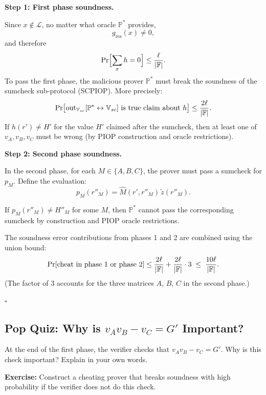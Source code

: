 \documentclass[11pt]{article}
\begin{document}
\medskip
\noindent\textbf{Step 1: First phase soundness.}

Since $x \notin \mathcal{L}$, no matter what oracle $\mathbb{P}^*$ provides,
\[
  g_{\mathrm{res}}(x) \neq 0,
\]
and therefore
\[
  \Pr\Bigl[\sum_x h = 0\Bigr] \leq \frac{\ell}{|\mathbb{F}|}.
\]
To pass the first phase, the malicious prover $\mathbb{P}^*$ must break the soundness of
the sumcheck sub-protocol (SCPIOP).  More precisely:
\[
  \Pr\bigl[\text{out}_{\mathbb{V}_{sc}}[\mathbb{P}^* \leftrightarrow \mathbb{V}_{sc}]
  \text{ is true claim about }h\bigr]
  \leq \frac{2\ell}{|\mathbb{F}|}.
\]
If $h(r') \neq H'$ for the value $H'$ claimed after the sumcheck, then at least one of
$v_A, v_B, v_C$ must be wrong (by PIOP construction and oracle restrictions).

\medskip
\noindent\textbf{Step 2: Second phase soundness.}

In the second phase, for each $M \in \{A, B, C\}$, the prover must pass a sumcheck for
$p_M$.  Define the evaluation:
\[
  p_M(r''_M) = \widehat{M}(r', r''_M)\,\tilde{z}(r''_M).
\]

\begin{claimbox}
  If $p_M(r''_M) \neq H''_M$ for some $M$, then $\mathbb{P}^*$ cannot pass the
  corresponding sumcheck by construction and PIOP oracle restrictions.
\end{claimbox}

The soundness error contributions from phases 1 and 2 are combined using the union bound:
\[
  \Pr[\text{cheat in phase 1 or phase 2}]
  \leq \frac{2\ell}{|\mathbb{F}|} + \frac{2\ell}{|\mathbb{F}|} \cdot 3
  \;\leq\; \frac{10\ell}{|\mathbb{F}|}.
\]
(The factor of 3 accounts for the three matrices $A$, $B$, $C$ in the second phase.)

\hfill $\square$

\subsection{Pop Quiz: Why is $v_A v_B - v_C = G'$ Important?}

\begin{tcolorbox}[colback=yellow!10, colframe=black!40, title=Pop Quiz]
  At the end of the first phase, the verifier checks that $v_A v_B - v_C = G'$.
  Why is this check important? Explain in your own words.

  \medskip
  \textbf{Exercise:} Construct a cheating prover that breaks soundness with high
  probability if the verifier does not do this check.
\end{tcolorbox}
\end{document}
